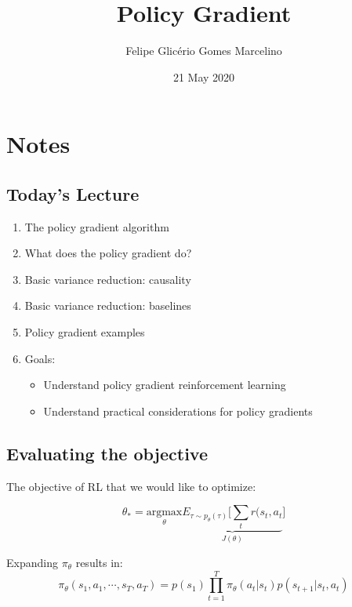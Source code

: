\documentclass[]{article}
\begin{document}
\title{Policy Gradient}
\author{Felipe Glicério Gomes Marcelino}
\date{21 May 2020}
\maketitle

\section{Notes}


\subsection*{Today's Lecture }%
\label{sub:Slide 3}

\begin{enumerate}
    \item The policy gradient algorithm
    \item What does the policy gradient do?
    \item Basic variance reduction: causality
    \item Basic variance reduction: baselines
    \item Policy gradient examples
    \item Goals:
        \begin{itemize}
            \item Understand policy gradient reinforcement learning
            \item Understand practical considerations for policy gradients
        \end{itemize}
\end{enumerate}

\subsection*{Evaluating the objective}%
\label{sub:Evaluating the objective}


\par The objective of RL that we would like to optimize: 

\begin{equation}
\label{eq:objective}
\theta_{*} = \underset{\theta}{\text{argmax}} \underbrace{E_{\tau \sim p_{\theta}(\tau)} \Big[
\sum_{t}r(s_{t},a_{t}}_{J(\theta)} \Big]
\end{equation}

Expanding $\pi_{\theta}$ results in:
\begin{equation}
    \label{eq:pitheta}
    \pi_{\theta}(s_1,a_1,\cdots,s_{T},a_{T}) = p(s_1) \prod_{t=1}^{T}\pi_{\theta}(a_{t}|s_{t})p(s_{t+1}|s_{t},a_{t})
\end{equation}
\end{document}
